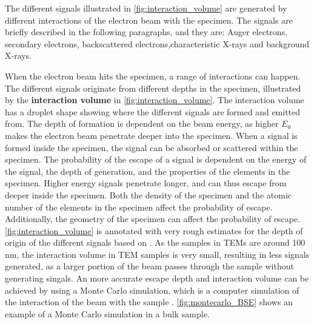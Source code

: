 The different signals illustrated in \cref{fig:interaction_volume} are generated by different interactions of the electron beam with the specimen.
The signals are briefly described in the following paragraphs, and they are: Auger electrons, secondary electrons, backscattered electrons,characteristic X-rays and background X-rays.



When the electron beam hits the specimen, a range of interactions can happen. %
The different signals originate from different depths in the specimen, illustrated by the \textbf{interaction volume} in \cref{fig:interaction_volume}.
The interaction volume has a droplet shape showing where the different signals are formed and emitted from.
The depth of formation is dependent on the beam energy, as higher $E_0$ makes the electron beam penetrate deeper into the specimen.
When a signal is formed inside the specimen, the signal can be absorbed or scattered within the specimen.
The probability of the escape of a signal is dependent on the energy of the signal, the depth of generation, and the properties of the elements in the specimen.
Higher energy signals penetrate longer, and can thus escape from deeper inside the specimen.
Both the density of the specimen and the atomic number of the elements in the specimen affect the probability of escape.
Additionally, the geometry of the specimen can affect the probability of escape.
\cref{fig:interaction_volume} is annotated with very rough estimates for the depth of origin of the different signals based on \cite{goldstein_scanning_2018,hollas_modern_2004}.
As the samples in TEMs are around 100 nm, the interaction volume in TEM samples is very small, resulting in less signals generated, as a larger portion of the beam passes through the sample without generating singals.
An more accurate escape depth and interaction volume can be achieved by using a Monte Carlo simulation, which is a computer simulation of the interaction of the beam with the sample \cite[Ch. 4.3.4]{goldstein_scanning_2018}.
\cref{fig:montecarlo_BSE} shows an example of a Monte Carlo simulation in a bulk sample.


